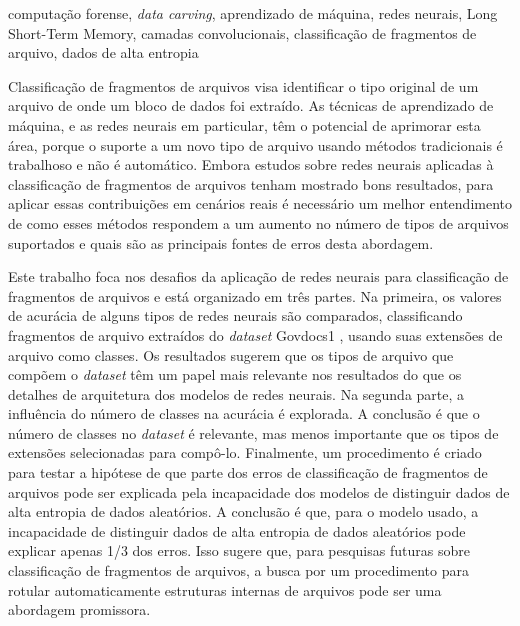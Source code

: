\begin{resumo}{computação forense, \textit{data carving}, aprendizado de máquina, redes neurais, Long Short-Term Memory, camadas convolucionais, classificação de fragmentos de arquivo, dados de alta entropia}

Classificação de fragmentos de arquivos visa identificar o tipo original de um arquivo de onde um bloco de dados foi extraído. As técnicas de aprendizado de máquina, e as redes neurais em particular, têm o potencial de aprimorar esta área, porque o suporte a um novo tipo de arquivo usando métodos tradicionais é trabalhoso e não é automático. Embora estudos sobre redes neurais aplicadas à classificação de fragmentos de arquivos tenham mostrado bons resultados, para aplicar essas contribuições em cenários reais é necessário um melhor entendimento de como esses métodos respondem a um aumento no número de tipos de arquivos suportados e quais são as principais fontes de erros desta abordagem.

Este trabalho foca nos desafios da aplicação de redes neurais para classificação de fragmentos de arquivos e está organizado em três partes.
Na primeira, os valores de acurácia de alguns tipos de redes neurais são comparados, classificando fragmentos de arquivo extraídos do \textit{dataset} Govdocs1 \cite{garfinkel_bringing_2009}, usando suas extensões de arquivo como classes.
Os resultados sugerem que os tipos de arquivo que compõem o \textit{dataset} têm um papel mais relevante nos resultados do que os detalhes de arquitetura dos modelos de redes neurais.
Na segunda parte, a influência do número de classes na acurácia é explorada.
A conclusão é que o número de classes no \textit{dataset} é relevante, mas menos importante que os tipos de extensões selecionadas para compô-lo.
Finalmente, um procedimento é criado para testar a hipótese de que parte dos erros de classificação de fragmentos de arquivos pode ser explicada pela incapacidade dos modelos de distinguir dados de alta entropia de dados aleatórios.
A conclusão é que, para o modelo usado, a incapacidade de distinguir dados de alta entropia de dados aleatórios pode explicar apenas 1/3 dos erros.
Isso sugere que, para pesquisas futuras sobre classificação de fragmentos de arquivos, a busca por um procedimento para rotular automaticamente estruturas internas de arquivos pode ser uma abordagem promissora.

\end{resumo}



